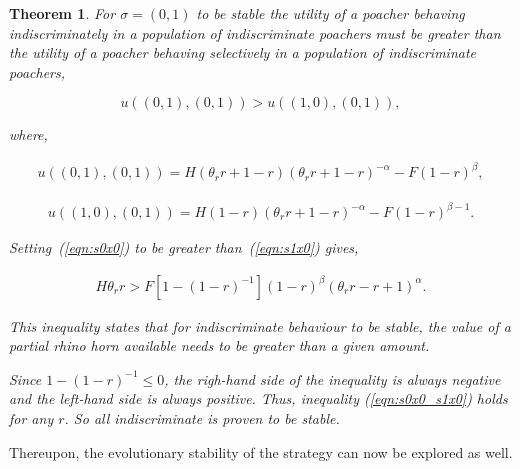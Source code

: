 \documentclass[10pt]{article}
\newtheorem{theorem}{Theorem}
\begin{document}
\begin{theorem}
	For \(\sigma=(0, 1)\) to be stable the utility of a poacher behaving 
	indiscriminately in a population of indiscriminate poachers must be greater
	than the utility of a poacher behaving selectively in a population of 
	indiscriminate poachers,

	\begin{equation}
	u((0, 1),(0, 1)) > u((1, 0),(0, 1)),
	\end{equation}

	where,

	\begin{eqnarray}
	\label{eqn:s0x0}
 	u((0, 1), (0, 1)) = H(\theta_r r + 1 - r)(\theta_r r + 1 - r)^{-\alpha}  - F(1 - r)^{\beta},
	\end{eqnarray}

	\begin{eqnarray}
	\label{eqn:s1x0}
	u((1, 0),(0, 1)) = H(1 - r)(\theta_r r + 1 - r)^{-\alpha} - F(1 - r)^{\beta-1}.
	\end{eqnarray}

	Setting~(\ref{eqn:s0x0}) to be greater than~(\ref{eqn:s1x0}) gives,

	\begin{eqnarray}
	\label{eqn:s0x0_s1x0}
	H \theta_r r  > F [1 - (1 - r)^{-1}](1 - r)^{\beta}(\theta_r r - r + 1)^{\alpha}.
	\end{eqnarray}

	This inequality states that for indiscriminate behaviour to be stable, the value of
	a partial rhino horn available needs to be greater than a given amount. 

	Since \(1-(1-r)^{-1} \leq 0\), the righ-hand side of the inequality is always
	negative and the left-hand side is always positive. Thus, inequality 
	(\ref{eqn:s0x0_s1x0}) holds for any \(r\). So all indiscriminate
	is proven to be stable.
\end{theorem}

Thereupon, the evolutionary stability of the strategy can now be explored as
well. 
\end{document}
